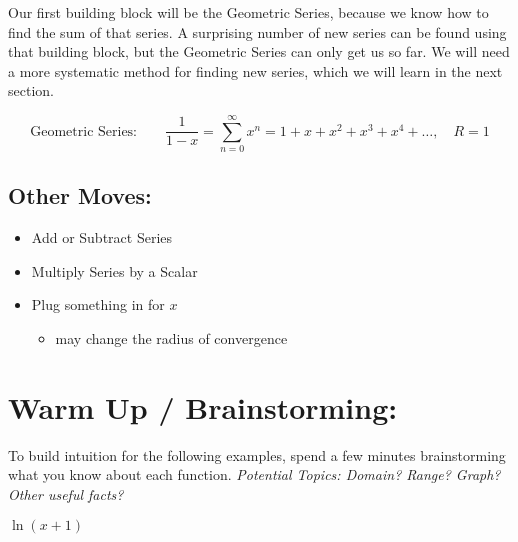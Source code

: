 Our first building block will be the Geometric Series, because we know how to find the sum of that series. A surprising number of new series can be found using that building block, but the Geometric Series can only get us so far. We will need a more systematic method for finding new series, which we will learn in the next section.

\[
\text{Geometric Series:}\qquad  \frac{1}{1-x}  = \sum_{n=0}^\infty x^{n}= 1+x+x^2+x^3+x^4+\ldots , \quad R=1
\]

\hspace*{.25in}
\subsection*{Other Moves:}
\begin{itemize}
\item Add or Subtract Series
\item Multiply Series by a Scalar
\item Plug something in for \(x\)
\begin{itemize}
\item may change the radius of convergence
\end{itemize}
\end{itemize}





\section*{Warm Up / Brainstorming:}
To build intuition for the following examples, spend a few minutes brainstorming what you know about each function. %
\textit{Potential Topics: Domain? Range? Graph? Other useful facts?}


\( \ln(x+1) \)

